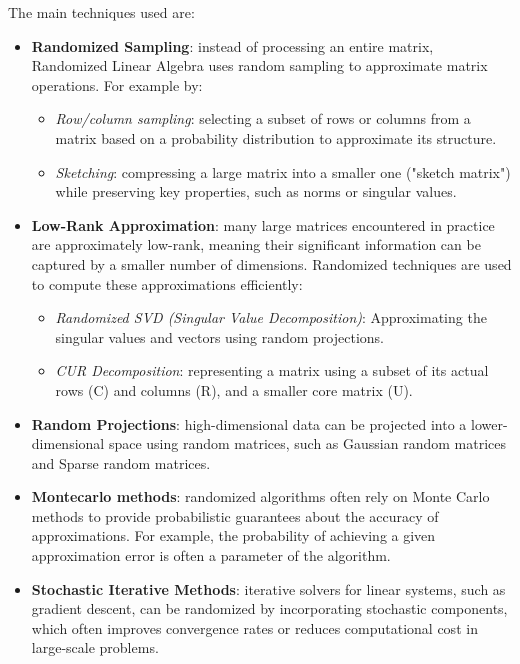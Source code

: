 \documentclass[11pt,a4paper]{article}
\begin{document}
The main techniques used are:
\begin{itemize}
    \item \textbf{Randomized Sampling}: instead of processing an entire matrix, Randomized Linear Algebra uses random sampling to approximate matrix operations. For example by:
          \begin{itemize}
              \item \textit{Row/column sampling}: selecting a subset of rows or columns from a matrix based on a probability distribution to approximate its structure.
              \item \textit{Sketching}: compressing a large matrix into a smaller one ("sketch matrix") while preserving key properties, such as norms or singular values.
          \end{itemize}
    \item \textbf{Low-Rank Approximation}: many large matrices encountered in practice are approximately low-rank, meaning their significant information can be captured by a smaller number of dimensions. Randomized techniques are used to compute these approximations efficiently:
          \begin{itemize}
              \item \textit{Randomized SVD (Singular Value Decomposition)}: Approximating the singular values and vectors using random projections.
              \item \textit{CUR Decomposition}: representing a matrix using a subset of its actual rows (C) and columns (R), and a smaller core matrix (U).
          \end{itemize}
    \item \textbf{Random Projections}: high-dimensional data can be projected into a lower-dimensional space using random matrices, such as Gaussian random matrices and Sparse random matrices.
    \item \textbf{Montecarlo methods}: randomized algorithms often rely on Monte Carlo methods to provide probabilistic guarantees about the accuracy of approximations. For example, the probability of achieving a given approximation error is often a parameter of the algorithm.
    \item \textbf{Stochastic Iterative Methods}: iterative solvers for linear systems, such as gradient descent, can be randomized by incorporating stochastic components, which often improves convergence rates or reduces computational cost in large-scale problems.
\end{itemize}
\end{document}
